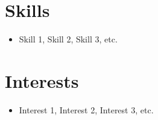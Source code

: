 \documentclass[11pt,a4paper]{article}
\begin{document}
    \section*{Skills}

    \begin{itemize}
        \item Skill 1, Skill 2, Skill 3, etc.
    \end{itemize}

    \section*{Interests}

    \begin{itemize}
        \item Interest 1, Interest 2, Interest 3, etc.
    \end{itemize}
\end{document}
